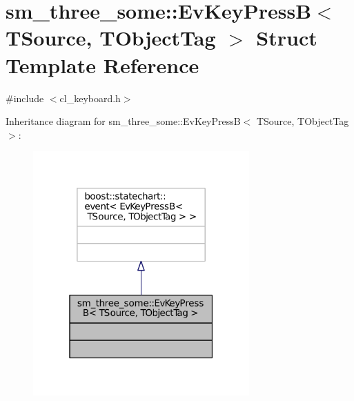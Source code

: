 \hypertarget{structsm__three__some_1_1EvKeyPressB}{}\section{sm\+\_\+three\+\_\+some\+:\+:Ev\+Key\+PressB$<$ T\+Source, T\+Object\+Tag $>$ Struct Template Reference}
\label{structsm__three__some_1_1EvKeyPressB}


{\ttfamily \#include $<$cl\+\_\+keyboard.\+h$>$}



Inheritance diagram for sm\+\_\+three\+\_\+some\+:\+:Ev\+Key\+PressB$<$ T\+Source, T\+Object\+Tag $>$\+:
\nopagebreak
\begin{figure}[H]
\begin{center}
\leavevmode
\includegraphics[width=235pt]{structsm__three__some_1_1EvKeyPressB__inherit__graph}
\end{center}
\end{figure}


